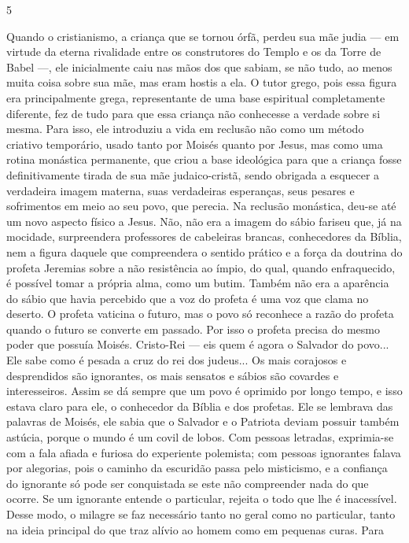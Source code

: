 5

Quando o cristianismo, a criança que se tornou órfã, perdeu sua mãe
judia --- em virtude da eterna rivalidade entre os construtores do
Templo e os da Torre de Babel ---, ele inicialmente caiu nas mãos dos
que sabiam, se não tudo, ao menos muita coisa sobre sua mãe, mas eram
hostis a ela. O tutor grego, pois essa figura era principalmente grega,
representante de uma base espiritual completamente diferente, fez de
tudo para que essa criança não conhecesse a verdade sobre si mesma. Para
isso, ele introduziu a vida em reclusão não como um método criativo
temporário, usado tanto por Moisés quanto por Jesus, mas como uma rotina
monástica permanente, que criou a base ideológica para que a criança
fosse definitivamente tirada de sua mãe judaico-cristã, sendo obrigada a
esquecer a verdadeira imagem materna, suas verdadeiras esperanças, seus
pesares e sofrimentos em meio ao seu povo, que perecia. Na reclusão
monástica, deu-se até um novo aspecto físico a Jesus. Não, não era a
imagem do sábio fariseu que, já na mocidade, surpreendera professores de
cabeleiras brancas, conhecedores da Bíblia, nem a figura daquele que
compreendera o sentido prático e a força da doutrina do profeta Jeremias
sobre a não resistência ao ímpio, do qual, quando enfraquecido, é
possível tomar a própria alma, como um butim. Também não era a aparência
do sábio que havia percebido que a voz do profeta é uma voz que clama no
deserto. O profeta vaticina o futuro, mas o povo só reconhece a razão do
profeta quando o futuro se converte em passado. Por isso o profeta
precisa do mesmo poder que possuía Moisés. Cristo-Rei --- eis quem é
agora o Salvador do povo... Ele sabe como é pesada a cruz do rei dos
judeus... Os mais corajosos e desprendidos são ignorantes, os mais
sensatos e sábios são covardes e interesseiros. Assim se dá sempre que
um povo é oprimido por longo tempo, e isso estava claro para ele, o
conhecedor da Bíblia e dos profetas. Ele se lembrava das palavras de
Moisés, ele sabia que o Salvador e o Patriota deviam possuir também
astúcia, porque o mundo é um covil de lobos. Com pessoas letradas,
exprimia-se com a fala afiada e furiosa do experiente polemista; com
pessoas ignorantes falava por alegorias, pois o caminho da escuridão
passa pelo misticismo, e a confiança do ignorante só pode ser
conquistada se este não compreender nada do que ocorre. Se um ignorante
entende o particular, rejeita o todo que lhe é inacessível. Desse modo,
o milagre se faz necessário tanto no geral como no particular, tanto na
ideia principal do que traz alívio ao homem como em pequenas curas. Para
